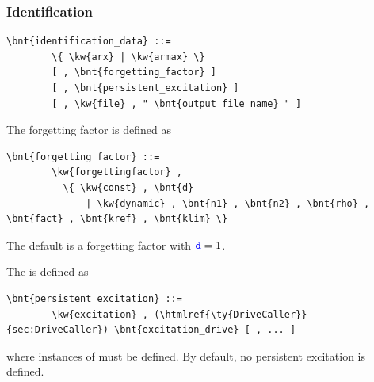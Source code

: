 \subsubsection{Identification}
\begin{Verbatim}[commandchars=\\\{\}]
    \bnt{identification_data} ::=
        \{ \kw{arx} | \kw{armax} \}
        [ , \bnt{forgetting_factor} ]
        [ , \bnt{persistent_excitation} ]
        [ , \kw{file} , " \bnt{output_file_name} " ]
\end{Verbatim}
The forgetting factor is defined as
\begin{Verbatim}[commandchars=\\\{\}]
    \bnt{forgetting_factor} ::=
        \kw{forgettingfactor} ,
          \{ \kw{const} , \bnt{d}
              | \kw{dynamic} , \bnt{n1} , \bnt{n2} , \bnt{rho} , \bnt{fact} , \bnt{kref} , \bnt{klim} \}
\end{Verbatim}
The default is a  forgetting factor with $\textcolor{blue}{\texttt{d}}=1$.

The  is defined as
\begin{Verbatim}[commandchars=\\\{\}]
    \bnt{persistent_excitation} ::=
        \kw{excitation} , (\htmlref{\ty{DriveCaller}}{sec:DriveCaller}) \bnt{excitation_drive} [ , ... ]
\end{Verbatim}
where  instances of  must be defined.
By default, no persistent excitation is defined.


